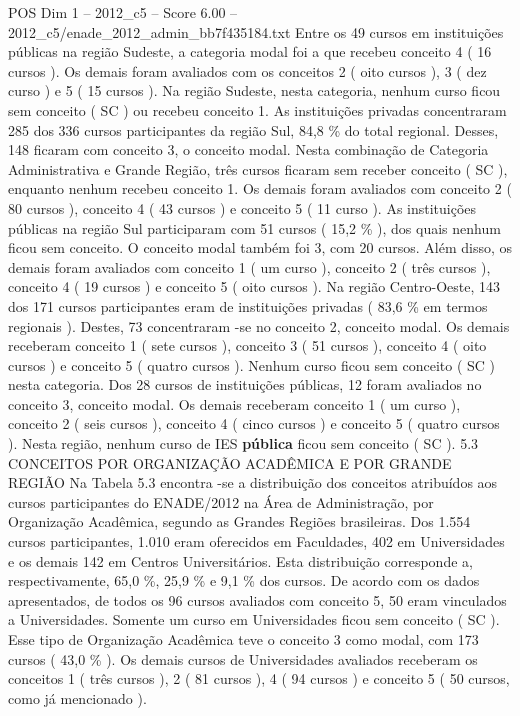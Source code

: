 \begin{textsample}{POS Dim 1 – 2012\_c5 – Score 6.00 – 2012\_c5/enade\_2012\_admin\_bb7f435184.txt}
Entre os 49 cursos em instituições públicas na região Sudeste, a categoria modal foi a que recebeu conceito 4 ( 16 cursos ).
Os demais foram avaliados com os conceitos 2 ( oito cursos ), 3 ( dez curso ) e 5 ( 15 cursos ).
Na região Sudeste, nesta categoria, nenhum curso ficou sem conceito ( SC ) ou recebeu conceito 1.
As instituições privadas concentraram 285 dos 336 cursos participantes da região Sul, 84,8 \% do total regional.
Desses, 148 ficaram com conceito 3, o conceito modal.
Nesta combinação de Categoria Administrativa e Grande Região, três cursos ficaram sem receber conceito ( SC ), enquanto nenhum recebeu conceito 1.
Os demais foram avaliados com conceito 2 ( 80 cursos ), conceito 4 ( 43 cursos ) e conceito 5 ( 11 curso ).
As instituições públicas na região Sul participaram com 51 cursos ( 15,2 \% ), dos quais nenhum ficou sem conceito.
O conceito modal também foi 3, com 20 cursos.
Além disso, os demais foram avaliados com conceito 1 ( um curso ), conceito 2 ( três cursos ), conceito 4 ( 19 cursos ) e conceito 5 ( oito cursos ).
Na região Centro-Oeste, 143 dos 171 cursos participantes eram de instituições privadas ( 83,6 \% em termos regionais ).
Destes, 73 concentraram -se no conceito 2, conceito modal.
Os demais receberam conceito 1 ( sete cursos ), conceito 3 ( 51 cursos ), conceito 4 ( oito cursos ) e conceito 5 ( quatro cursos ).
Nenhum curso ficou sem conceito ( SC ) nesta categoria.
Dos 28 cursos de instituições públicas, 12 foram avaliados no conceito 3, conceito modal.
Os demais receberam conceito 1 ( um curso ), conceito 2 ( seis cursos ), conceito 4 ( cinco cursos ) e conceito 5 ( quatro cursos ).
Nesta região, nenhum curso de IES \textbf{pública} ficou sem conceito ( SC ). 5.3 CONCEITOS POR ORGANIZAÇÃO ACADÊMICA E POR GRANDE REGIÃO Na Tabela 5.3 encontra -se a distribuição dos conceitos atribuídos aos cursos participantes do ENADE/2012 na Área de Administração, por Organização Acadêmica, segundo as Grandes Regiões brasileiras.
Dos 1.554 cursos participantes, 1.010 eram oferecidos em Faculdades, 402 em Universidades e os demais 142 em Centros Universitários.
Esta distribuição corresponde a, respectivamente, 65,0 \%, 25,9 \% e 9,1 \% dos cursos.
De acordo com os dados apresentados, de todos os 96 cursos avaliados com conceito 5, 50 eram vinculados a Universidades.
Somente um curso em Universidades ficou sem conceito ( SC ).
Esse tipo de Organização Acadêmica teve o conceito 3 como modal, com 173 cursos ( 43,0 \% ).
Os demais cursos de Universidades avaliados receberam os conceitos 1 ( três cursos ), 2 ( 81 cursos ), 4 ( 94 cursos ) e conceito 5 ( 50 cursos, como já mencionado ).

\end{textsample}
